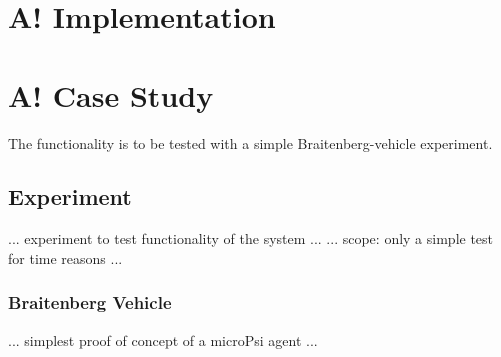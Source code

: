 \section{A! Implementation}

\section{A! Case Study}

The functionality is to be tested with a simple Braitenberg-vehicle experiment.

\subsection{Experiment}
... experiment to test functionality of the system ...
... scope: only a simple test for time reasons ...

\subsubsection{Braitenberg Vehicle}
... simplest proof of concept of a microPsi agent ...